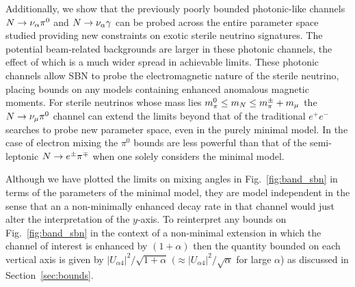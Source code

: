 \documentclass[11pt, a4paper]{article}
\newcommand{\reffig}[1]{Fig.~\ref{#1}}
\newcommand{\refsec}[1]{Section~\ref{#1}}
\def\ster{\ensuremath N}
\begin{document}
Additionally, we show that the previously poorly bounded photonic-like
channels $\ster \rightarrow \nu_\alpha \pi^0$ and $\ster \rightarrow \nu_\alpha
\gamma$ can be probed across the entire parameter space studied providing new
constraints on exotic sterile neutrino signatures. The potential beam-related
backgrounds are larger in these photonic channels, the effect of which is a
much wider spread in achievable limits. These photonic channels allow SBN to
probe the electromagnetic nature of the sterile neutrino, placing bounds on any
models containing enhanced anomalous magnetic moments. 
%
For sterile neutrinos whose mass lies  $m_\pi^0 \leq m_\ster \leq m_\pi^\pm +m_\mu$ the
$\ster \rightarrow \nu_\mu \pi^0$ channel can extend the limits beyond that of
the traditional $e^+e^-$ searches to probe new parameter space, even in the
purely minimal model. In the case of electron mixing the $\pi^0$ bounds are
less powerful than that of the semi-leptonic $\ster \rightarrow e^\pm \pi^\mp$
when one solely considers the minimal model.

Although we have plotted the limits on mixing angles in \reffig{fig:band_sbn}
in terms of the parameters of the minimal model, they are model independent in
the sense that an a non-minimally enhanced decay rate in that channel would
just alter the interpretation of the $y$-axis. To reinterpret any bounds on
\reffig{fig:band_sbn} in the context of a non-minimal extension in which the
channel of interest is enhanced by $(1+\alpha)$ then the quantity bounded on
each vertical axis is given by  $|U_{\alpha 4}|^2/\sqrt{1+\alpha}$ $(\approx
|U_{\alpha 4}|^2/\sqrt{\alpha} $ for large $\alpha$) as discussed in
\refsec{sec:bounds}.  
\end{document}

